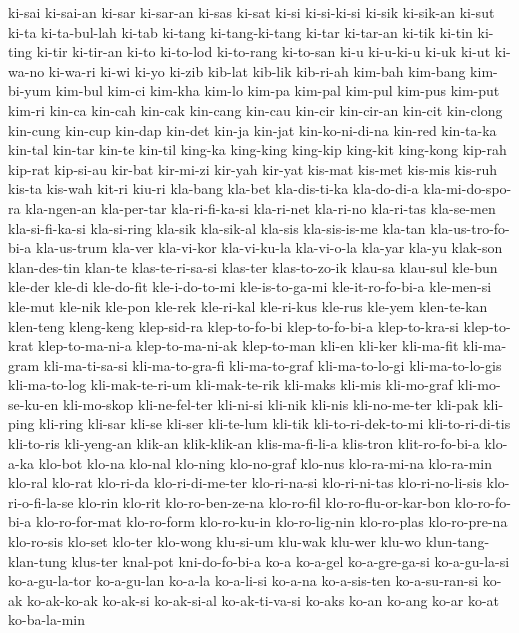 {ki-sai ki-sai-an ki-sar ki-sar-an ki-sas ki-sat ki-si ki-si-ki-si ki-sik
ki-sik-an ki-sut ki-ta ki-ta-bul-lah ki-tab ki-tang ki-tang-ki-tang ki-tar
ki-tar-an ki-tik ki-tin ki-ting ki-tir ki-tir-an ki-to ki-to-lod
ki-to-rang ki-to-san ki-u ki-u-ki-u ki-uk ki-ut ki-wa-no ki-wa-ri ki-wi
ki-yo ki-zib kib-lat kib-lik kib-ri-ah kim-bah kim-bang kim-bi-yum kim-bul
kim-ci kim-kha kim-lo kim-pa kim-pal kim-pul kim-pus kim-put kim-ri kin-ca
kin-cah kin-cak kin-cang kin-cau kin-cir kin-cir-an kin-cit kin-clong
kin-cung kin-cup kin-dap kin-det kin-ja kin-jat kin-ko-ni-di-na kin-red
kin-ta-ka kin-tal kin-tar kin-te kin-til king-ka king-king king-kip
king-kit king-kong kip-rah kip-rat kip-si-au kir-bat kir-mi-zi kir-yah
kir-yat kis-mat kis-met kis-mis kis-ruh kis-ta kis-wah kit-ri kiu-ri
kla-bang kla-bet kla-dis-ti-ka kla-do-di-a kla-mi-do-spo-ra kla-ngen-an
kla-per-tar kla-ri-fi-ka-si kla-ri-net kla-ri-no kla-ri-tas kla-se-men
kla-si-fi-ka-si kla-si-ring kla-sik kla-sik-al kla-sis kla-sis-is-me
kla-tan kla-us-tro-fo-bi-a kla-us-trum kla-ver kla-vi-kor kla-vi-ku-la
kla-vi-o-la kla-yar kla-yu klak-son klan-des-tin klan-te klas-te-ri-sa-si
klas-ter klas-to-zo-ik klau-sa klau-sul kle-bun kle-der kle-di kle-do-fit
kle-i-do-to-mi kle-is-to-ga-mi kle-it-ro-fo-bi-a kle-men-si kle-mut
kle-nik kle-pon kle-rek kle-ri-kal kle-ri-kus kle-rus kle-yem klen-te-kan
klen-teng kleng-keng klep-sid-ra klep-to-fo-bi klep-to-fo-bi-a
klep-to-kra-si klep-to-krat klep-to-ma-ni-a klep-to-ma-ni-ak klep-to-man
kli-en kli-ker kli-ma-fit kli-ma-gram kli-ma-ti-sa-si kli-ma-to-gra-fi
kli-ma-to-graf kli-ma-to-lo-gi kli-ma-to-lo-gis kli-ma-to-log
kli-mak-te-ri-um kli-mak-te-rik kli-maks kli-mis kli-mo-graf
kli-mo-se-ku-en kli-mo-skop kli-ne-fel-ter kli-ni-si kli-nik kli-nis
kli-no-me-ter kli-pak kli-ping kli-ring kli-sar kli-se kli-ser kli-te-lum
kli-tik kli-to-ri-dek-to-mi kli-to-ri-di-tis kli-to-ris kli-yeng-an
klik-an klik-klik-an klis-ma-fi-li-a klis-tron klit-ro-fo-bi-a klo-a-ka
klo-bot klo-na klo-nal klo-ning klo-no-graf klo-nus klo-ra-mi-na
klo-ra-min klo-ral klo-rat klo-ri-da klo-ri-di-me-ter klo-ri-na-si
klo-ri-ni-tas klo-ri-no-li-sis klo-ri-o-fi-la-se klo-rin klo-rit
klo-ro-ben-ze-na klo-ro-fil klo-ro-flu-or-kar-bon klo-ro-fo-bi-a
klo-ro-for-mat klo-ro-form klo-ro-ku-in klo-ro-lig-nin klo-ro-plas
klo-ro-pre-na klo-ro-sis klo-set klo-ter klo-wong klu-si-um klu-wak
klu-wer klu-wo klun-tang-klan-tung klus-ter knal-pot kni-do-fo-bi-a ko-a
ko-a-gel ko-a-gre-ga-si ko-a-gu-la-si ko-a-gu-la-tor ko-a-gu-lan ko-a-la
ko-a-li-si ko-a-na ko-a-sis-ten ko-a-su-ran-si ko-ak ko-ak-ko-ak ko-ak-si
ko-ak-si-al ko-ak-ti-va-si ko-aks ko-an ko-ang ko-ar ko-at ko-ba-la-min
}
